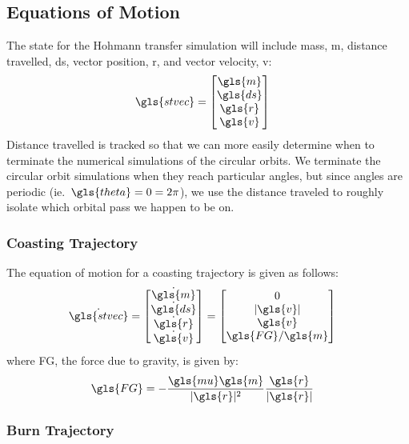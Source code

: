 \documentclass[12pt,openany]{book}
\begin{document}
\subsection{Equations of Motion}

The state for the Hohmann transfer simulation will include mass, \gls{m}, distance travelled, \gls{ds}, vector position, \gls{r}, and vector velocity, \gls{v}:
\begin{align}
  \gls{stvec} &= \begin{bmatrix}\gls{m}\\\gls{ds}\\\gls{r}\\\gls{v}\end{bmatrix}
\end{align}
Distance travelled is tracked so that we can more easily determine when to terminate the numerical simulations of the circular orbits. We terminate the circular orbit simulations when they reach particular angles, but since angles are periodic (ie.\ \(\gls{theta}=0=2\pi\)), we use the distance traveled to roughly isolate which orbital pass we happen to be on.

\subsubsection{Coasting Trajectory}

The equation of motion for a coasting trajectory is given as follows:
\begin{align}
  \dot{\gls{stvec}}
  = \begin{bmatrix}\dot{\gls{m}}\\\dot{\gls{ds}}\\\dot{\gls{r}}\\\dot{\gls{v}}\end{bmatrix}
  &= \begin{bmatrix}
    0 \\
    |\gls{v}| \\
    \gls{v} \\
    \gls{FG}/\gls{m}
  \end{bmatrix}
\end{align}
where \gls{FG}, the force due to gravity, is given by:
\begin{align}
  \gls{FG} &= -\frac{\gls{mu}\gls{m}}{|\gls{r}|^2}\frac{\gls{r}}{|\gls{r}|}
\end{align}

\subsubsection{Burn Trajectory}
\end{document}
